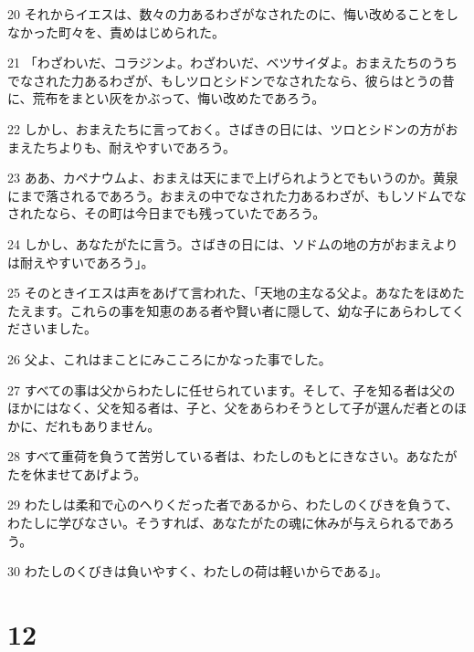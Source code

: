 \par 20 それからイエスは、数々の力あるわざがなされたのに、悔い改めることをしなかった町々を、責めはじめられた。
\par 21 「わざわいだ、コラジンよ。わざわいだ、ベツサイダよ。おまえたちのうちでなされた力あるわざが、もしツロとシドンでなされたなら、彼らはとうの昔に、荒布をまとい灰をかぶって、悔い改めたであろう。
\par 22 しかし、おまえたちに言っておく。さばきの日には、ツロとシドンの方がおまえたちよりも、耐えやすいであろう。
\par 23 ああ、カペナウムよ、おまえは天にまで上げられようとでもいうのか。黄泉にまで落されるであろう。おまえの中でなされた力あるわざが、もしソドムでなされたなら、その町は今日までも残っていたであろう。
\par 24 しかし、あなたがたに言う。さばきの日には、ソドムの地の方がおまえよりは耐えやすいであろう」。
\par 25 そのときイエスは声をあげて言われた、「天地の主なる父よ。あなたをほめたたえます。これらの事を知恵のある者や賢い者に隠して、幼な子にあらわしてくださいました。
\par 26 父よ、これはまことにみこころにかなった事でした。
\par 27 すべての事は父からわたしに任せられています。そして、子を知る者は父のほかにはなく、父を知る者は、子と、父をあらわそうとして子が選んだ者とのほかに、だれもありません。
\par 28 すべて重荷を負うて苦労している者は、わたしのもとにきなさい。あなたがたを休ませてあげよう。
\par 29 わたしは柔和で心のへりくだった者であるから、わたしのくびきを負うて、わたしに学びなさい。そうすれば、あなたがたの魂に休みが与えられるであろう。
\par 30 わたしのくびきは負いやすく、わたしの荷は軽いからである」。

\chapter{12}

